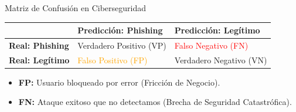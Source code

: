 \documentclass[aspectratio=169]{beamer}
\begin{document}
\begin{frame}{Matriz de Confusión en Ciberseguridad}
    \begin{table}[]
        \centering
        \begin{tabular}{|l|l|l|}
        \hline
        \textbf{} & \textbf{Predicción: Phishing} & \textbf{Predicción: Legítimo} \\ \hline
        \textbf{Real: Phishing} & Verdadero Positivo (VP) & \textcolor{red}{Falso Negativo (FN)} \\ \hline
        \textbf{Real: Legítimo} & \textcolor{orange}{Falso Positivo (FP)} & Verdadero Negativo (VN) \\ \hline
        \end{tabular}
    \end{table}
    
    \begin{itemize}
        \item \textbf{FP:} Usuario bloqueado por error (Fricción de Negocio).
        \item \textbf{FN:} Ataque exitoso que no detectamos (Brecha de Seguridad Catastrófica).
    \end{itemize}
\end{frame}
\end{document}

